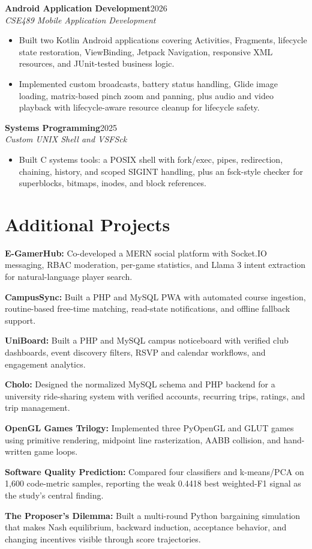 \documentclass[10pt,a4paper]{article}
\newcommand{\entry}[3]{%
  \textbf{#1}\hfill {\color{gray}#3}\\[-0.08em]
  \textit{#2}\vspace{0.05em}
}
\newcommand{\projectline}[2]{\textbf{#1:} #2\par}
\begin{document}
\entry{Android Application Development}{CSE489 Mobile Application Development}{2026}
\begin{itemize}
  \item Built two Kotlin Android applications covering Activities, Fragments, lifecycle state restoration, ViewBinding, Jetpack Navigation, responsive XML resources, and JUnit-tested business logic.
  \item Implemented custom broadcasts, battery status handling, Glide image loading, matrix-based pinch zoom and panning, plus audio and video playback with lifecycle-aware resource cleanup for lifecycle safety.
\end{itemize}

\entry{Systems Programming}{Custom UNIX Shell and VSFSck}{2025}
\begin{itemize}
  \item Built C systems tools: a POSIX shell with fork/exec, pipes, redirection, chaining, history, and scoped SIGINT handling, plus an fsck-style checker for superblocks, bitmaps, inodes, and block references.
\end{itemize}

\section{Additional Projects}
\projectline{E-GamerHub}{Co-developed a MERN social platform with Socket.IO messaging, RBAC moderation, per-game statistics, and Llama 3 intent extraction for natural-language player search.}
\projectline{CampusSync}{Built a PHP and MySQL PWA with automated course ingestion, routine-based free-time matching, read-state notifications, and offline fallback support.}
\projectline{UniBoard}{Built a PHP and MySQL campus noticeboard with verified club dashboards, event discovery filters, RSVP and calendar workflows, and engagement analytics.}
\projectline{Cholo}{Designed the normalized MySQL schema and PHP backend for a university ride-sharing system with verified accounts, recurring trips, ratings, and trip management.}
\projectline{OpenGL Games Trilogy}{Implemented three PyOpenGL and GLUT games using primitive rendering, midpoint line rasterization, AABB collision, and hand-written game loops.}
\projectline{Software Quality Prediction}{Compared four classifiers and k-means/PCA on 1,600 code-metric samples, reporting the weak 0.4418 best weighted-F1 signal as the study's central finding.}
\projectline{The Proposer's Dilemma}{Built a multi-round Python bargaining simulation that makes Nash equilibrium, backward induction, acceptance behavior, and changing incentives visible through score trajectories.}
\end{document}
